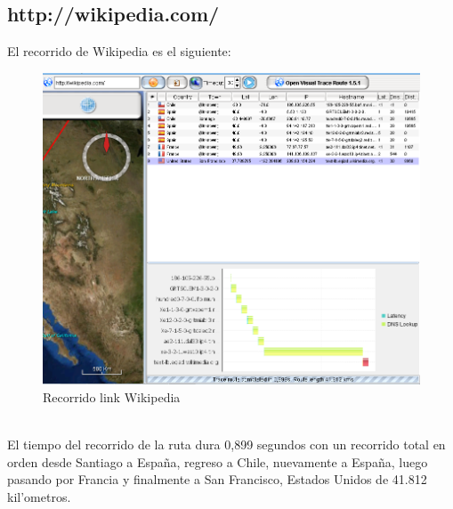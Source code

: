 \documentclass{article}
\begin{document}
\subsection{http://wikipedia.com/}
El recorrido de Wikipedia es el siguiente:
\\
\begin{figure}[H]
  \centering
    \includegraphics[width=1.0\textwidth]{ruta1_wikipedia}
  \caption{Recorrido link Wikipedia}
  \label{wikipedia}
\end{figure}\\

El tiempo del recorrido de la ruta dura 0,899 segundos con un recorrido total en orden desde Santiago a España, regreso a Chile, nuevamente a España, luego pasando por Francia y finalmente a San Francisco, Estados Unidos de 41.812 kil'ometros.
\end{document}
